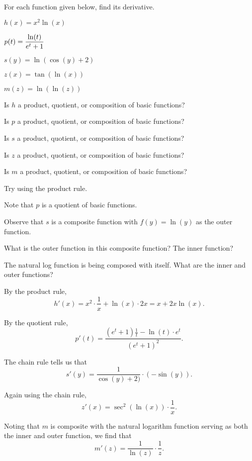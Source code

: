 \begin{activity} \label{A:2.6.1}  
For each function given below, find its derivative.
\ba
	   \item $h(x) = x^2\ln(x)$
	   \item  $p(t) = \displaystyle \frac{\ln(t)}{e^t + 1}$
           \item $s(y) = \ln(\cos(y) + 2)$
           \item $z(x) = \tan(\ln(x))$
           \item $m(z) = \ln(\ln(z))$
\ea
\end{activity}
\begin{smallhint}
\ba
	   \item Is $h$ a product, quotient, or composition of basic functions?
	   \item Is $p$ a product, quotient, or composition of basic functions?
	   \item Is $s$ a product, quotient, or composition of basic functions?
	   \item Is $z$ a product, quotient, or composition of basic functions?
	   \item Is $m$ a product, quotient, or composition of basic functions?
\ea
\end{smallhint}
\begin{bighint}
\ba
	   \item Try using the product rule.
	   \item Note that $p$ is a quotient of basic functions.
	   \item Observe that $s$ is a composite function with $f(y) = \ln(y)$ as the outer function.
	   \item What is the outer function in this composite function?  The inner function?
	   \item The natural log function is being composed with itself.  What are the inner and outer functions?
\ea
\end{bighint}
\begin{activitySolution}
\ba
	   \item By the product rule, 
	   $$h'(x) = x^2\cdot \frac{1}{x} + \ln(x) \cdot 2x = x + 2x\ln(x).$$
	   \item By the quotient rule, 
	   $$p'(t) = \frac{(e^t + 1) \frac{1}{t} - \ln(t) \cdot e^t}{(e^t + 1)^2}.$$
           \item The chain rule tells us that
           $$s'(y) = \frac{1}{\cos(y) + 2)} \cdot (-\sin(y)).$$
           \item Again using the chain rule,
           $$z'(x) = \sec^2(\ln(x)) \cdot \frac{1}{x}.$$
           \item Noting that $m$ is composite with the natural logarithm function serving as both the inner and outer function, we find that
           $$m'(z) = \frac{1}{\ln(z)} \cdot \frac{1}{z}.$$
\ea
\end{activitySolution}
\aftera